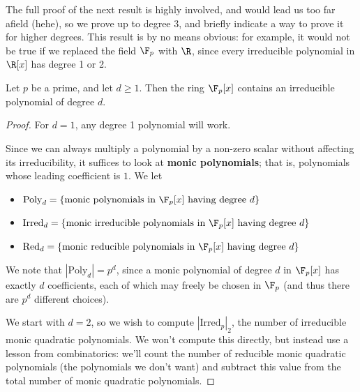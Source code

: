 \documentclass[math1530-lecture-notes]{subfiles}
\begin{document}
The full proof of the next result is highly involved, and would lead us too far afield (hehe), so we
prove up to degree 3, and briefly indicate a way to prove it for higher degrees. This result is by
no means obvious: for example, it would not be true if we replaced the field $\F_p$ with $\R$, since
every irreducible polynomial in $\R[x]$ has degree 1 or 2.

\begin{theorem}{}
  Let $p$ be a prime, and let $d\ge 1$. Then the ring $\F_p[x]$ contains an irreducible polynomial
  of degree $d$.
\end{theorem}

\begin{proof}[Proof]
  For $d=1$, any degree 1 polynomial will work.

  Since we can always multiply a polynomial by a non-zero scalar without affecting its
  irreducibility, it suffices to look at \textbf{monic polynomials}; that is, polynomials whose
  leading coefficient is $1$. We let
  \begin{itemize}
    \item $\text{Poly}_d=\{ \text{monic polynomials in $\F_p[x]$ having degree $d$} \}$
    \item $\text{Irred}_d=\{ \text{monic irreducible polynomials in $\F_p[x]$ having degree $d$} \}$
    \item $\text{Red}_d=\{ \text{monic reducible polynomials in $\F_p[x]$ having degree $d$} \}$
  \end{itemize}
  We note that $\left| \text{Poly}_d \right| =p^d$, since a monic polynomial of degree $d$ in
  $\F_p[x]$  has exactly $d$ coefficients, each of which may freely be chosen in $\F_p$ (and thus
  there are $p^d$ different choices).

  We start with $d=2$, so we wish to compute $\left| \text{Irred}_p \right|_2$, the number of
  irreducible monic quadratic polynomials. We won't compute this directly, but instead use a lesson
  from combinatorics: we'll count the number of reducible monic quadratic polynomials (the
  polynomials we don't want) and subtract this value from the total number of monic quadratic
  polynomials.


\end{proof}
\end{document}
